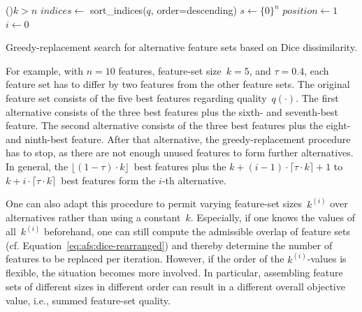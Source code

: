 \documentclass{article}
\theoremstyle{definition}
\begin{document}
\begin{algorithm}[htb]
	\DontPrintSemicolon
	\BlankLine
	\If(){$k > n$}{
		\Return{$\emptyset$}
	}
	$indices \leftarrow$ sort\_indices($q$, order=descending) 
	$s \leftarrow \{0\}^n$ 
	$position \leftarrow 1$ 
	$i \leftarrow 0$\ 
	\caption{Greedy-replacement search for alternative feature sets based on Dice dissimilarity.}
	\label{al:afs:greedy-replacement}
\end{algorithm}

For example, with $n=10$ features, feature-set size~$k=5$, and $\tau=0.4$, each feature set has to differ by two features from the other feature sets.
The original feature set consists of the five best features regarding quality~$q(\cdot)$.
The first alternative consists of the three best features plus the sixth- and seventh-best feature.
The second alternative consists of the three best features plus the eight- and ninth-best feature.
After that alternative, the greedy-replacement procedure has to stop, as there are not enough unused features to form further alternatives.
In general, the $\lfloor (1 - \tau) \cdot k \rfloor$~best features plus the $k + (i-1) \cdot \lceil \tau \cdot k \rceil + 1$ to $k + i \cdot \lceil \tau \cdot k \rceil$~best features form the $i$-th alternative.

One can also adapt this procedure to permit varying feature-set sizes~$k^{(i)}$ over alternatives rather than using a constant~$k$.
Especially, if one knows the values of all~$k^{(i)}$ beforehand, one can still compute the admissible overlap of feature sets (cf. Equation~\ref{eq:afs:dice-rearranged}) and thereby determine the number of features to be replaced per iteration.
However, if the order of the $k^{(i)}$-values is flexible, the situation becomes more involved.
In particular, assembling feature sets of different sizes in different order can result in a different overall objective value, i.e., summed feature-set quality.
\end{document}
